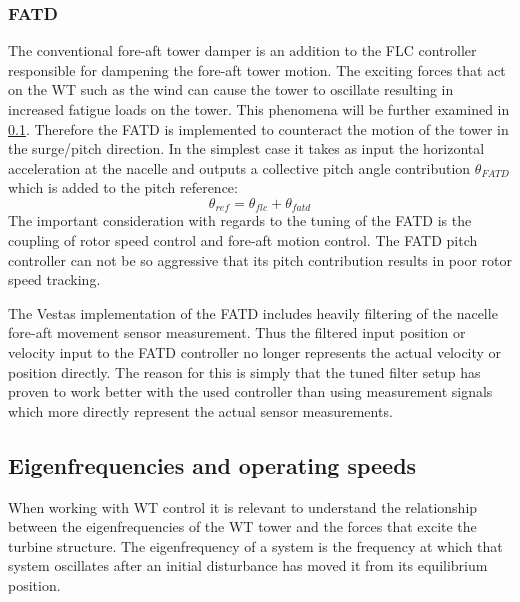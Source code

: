 \subsubsection{FATD}
The conventional fore-aft tower damper is an addition to the FLC controller responsible for dampening the fore-aft tower motion. The exciting forces that act on the WT such as the wind can cause the tower to oscillate resulting in increased fatigue loads on the tower. This phenomena will be further examined in \cref{sec:eigenfreq}. Therefore the FATD is implemented to counteract the motion of the tower in the surge/pitch direction. In the simplest case it takes as input the horizontal acceleration at the nacelle and outputs a collective pitch angle contribution $ \theta_{FATD} $ which is added to the pitch reference:
\begin{equation}\label{eq:fatd}
	\theta_{ref} = \theta_{flc} + \theta_{fatd}
\end{equation}
The important consideration with regards to the tuning of the FATD is the coupling of rotor speed control and fore-aft motion control. The FATD pitch controller can not be so aggressive that its pitch contribution results in poor rotor speed tracking.

The Vestas implementation of the FATD includes heavily filtering of the nacelle fore-aft movement sensor measurement. Thus the filtered input position or velocity input to the FATD controller no longer represents the actual velocity or position directly. The reason for this is simply that the tuned filter setup has proven to work better with the used controller than using measurement signals which more directly represent the actual sensor measurements.


\subsection{Eigenfrequencies and operating speeds} \label{sec:eigenfreq}
When working with WT control it is relevant to understand the relationship between the eigenfrequencies of the WT tower and the forces that excite the turbine structure. The eigenfrequency of a system is the frequency at which that system oscillates after an initial disturbance has moved it from its equilibrium position.

